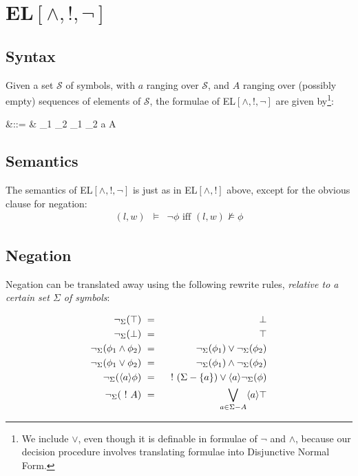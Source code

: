 \section{EL$[\land, !, \neg]$}


\subsection{Syntax}

Given a set $\mathcal{S}$ of symbols, with $a$ ranging over
$\mathcal{S}$, and $A$ ranging over (possibly empty) sequences of
elements of $\mathcal{S}$, the formulae of EL$[\land, !, \neg]$ are
given by\footnote{We include $\lor$, even though it is definable in
formulae of $\neg$ and $\land$, because our decision procedure involves
translating formulae into Disjunctive Normal Form.}:

\begin{GRAMMAR}
  \phi 
     &\quad ::= \quad & 
   \top \fOr \bot \fOr \neg \phi \fOr \phi_1 \land \phi_2 \fOr\phi_1 \lor \phi_2 \fOr \langle a \rangle \phi \fOr \fBang A 
\end{GRAMMAR}

\subsection{Semantics}

The semantics of EL$[\land, !, \neg]$ is just as in EL$[\land, !]$
above, except for the obvious clause for negation:
\begin{eqnarray*}
(l,w) & \models & \neg \phi \mbox{ iff } (l,w) \nvDash \phi 
\end{eqnarray*}

\subsection{Negation}

Negation can be translated away using the following rewrite rules,
\emph{relative to a certain set $\Sigma$ of symbols}:

\begin{eqnarray*}
  \neg_{\Sigma}(\top) & \ = \ & \bot  \\
  \neg_\Sigma(\bot) & \ = \ & \top  \\
  \neg_\Sigma(\phi_1 \land \phi_2) & \ = \ & \neg_\Sigma(\phi_1) \lor \neg_\Sigma(\phi_2)  \\
  \neg_\Sigma(\phi_1 \lor \phi_2) & \ = \ & \neg_\Sigma(\phi_1) \land \neg_\Sigma(\phi_2)  \\
  \neg_\Sigma(\langle a \rangle \phi) & \ = \ & \ ! \ (\Sigma-\{a\}) \lor \langle a \rangle \neg_\Sigma(\phi)  \\
  \neg_\Sigma(\ ! \  A) & \ = \ & \bigvee_{a \in \Sigma - A} \langle a \rangle \top
\end{eqnarray*}

